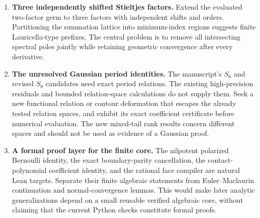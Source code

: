 \begin{enumerate}[label=\textbf{Q\arabic*.},leftmargin=*]
\item \textbf{Three independently shifted Stieltjes factors.}
Extend the evaluated two-factor germ to three factors
with independent shifts and orders. Partitioning the
summation lattice into minimum-index regions suggests
finite Lauricella-type prefixes. The central problem is
to remove all intersecting spectral poles jointly while
retaining geometric convergence after every derivative.

\item \textbf{The unresolved Gaussian period identities.}
The manuscript's \(S_6\) and revised \(S_8\) candidates
need exact period relations. The existing high-precision
residuals and bounded relation-space calculations do
not supply them. Seek a new functional relation or
contour deformation that escapes the already tested
relation spaces, and exhibit its exact coefficient
certificate before numerical evaluation. The new
mixed-tail rank results concern different spaces and
should not be used as evidence of a Gaussian proof.

\item \textbf{A formal proof layer for the finite core.}
The nilpotent polarized Bernoulli identity, the exact
boundary-parity cancellation, the contact-polynomial
coefficient identity, and the rational face compiler
are natural Lean targets. Separate their finite
algebraic statements from Euler--Maclaurin continuation
and normal-convergence lemmas. This would make later
analytic generalizations depend on a small reusable
verified algebraic core, without claiming that the
current Python checks constitute formal proofs.
\end{enumerate}


